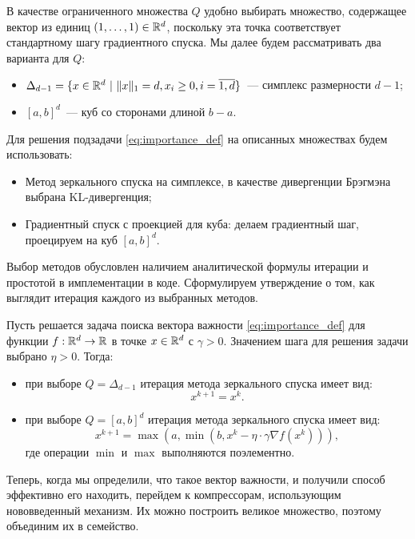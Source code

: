     В качестве ограниченного множества $Q$ удобно выбирать множество, содержащее вектор из единиц $(1, \dots, 1) \in \mathbb{R}^d$, поскольку эта точка соответствует стандартному шагу градиентного спуска. Мы далее будем рассматривать два варианта для $Q$:
    \begin{itemize}
        \item $\Delta_{d - 1} = \{x \in \mathbb{R}^d ~|~ \|x\|_1 = d, x_i \geq 0, i = \overline{1, d}\}$~--- симплекс размерности $d - 1$;
        \item $[a, b]^d$~--- куб со сторонами длиной $b - a$.
    \end{itemize}
    Для решения подзадачи \eqref{eq:importance_def} на описанных множествах будем использовать:
    \begin{itemize}
        \item Метод зеркального спуска на симплексе, в качестве дивергенции Брэгмэна выбрана KL-дивергенция;
        \item Градиентный спуск с проекцией для куба: делаем градиентный шаг, проецируем на куб $[a, b]^d$.
    \end{itemize}
    Выбор методов обусловлен наличием аналитической формулы итерации и простотой в имплементации в коде. Сформулируем утверждение о том, как выглядит итерация каждого из выбранных методов.
    \begin{proposition}
        Пусть решается задача поиска вектора важности \eqref{eq:importance_def} для функции $f: \mathbb{R}^d \to \mathbb{R}$ в точке $x \in \mathbb{R}^d$ с $\gamma > 0$. Значением шага для решения задачи выбрано $\eta > 0$. Тогда:
        \begin{itemize}
            \item при выборе $Q = \Delta_{d - 1}$ итерация метода зеркального спуска имеет вид:
            \begin{equation}\label{eq:mirror_descent_step}
                x^{k + 1} = x^k.
            \end{equation}
            \item при выборе $Q = [a, b]^d$ итерация метода зеркального спуска имеет вид:
            \begin{equation}\label{eq:proj_gradient_descent_step}
                x^{k + 1} = \max(a, \min(b, x^k - \eta \cdot \gamma \nabla f(x^k))),
            \end{equation}
            где операции $\min$ и $\max$ выполняются поэлементно.
        \end{itemize}
    \end{proposition}
    Теперь, когда мы определили, что такое вектор важности, и получили способ эффективно его находить, перейдем к компрессорам, использующим нововведенный механизм. Их можно построить великое множество, поэтому объединим их в семейство.
